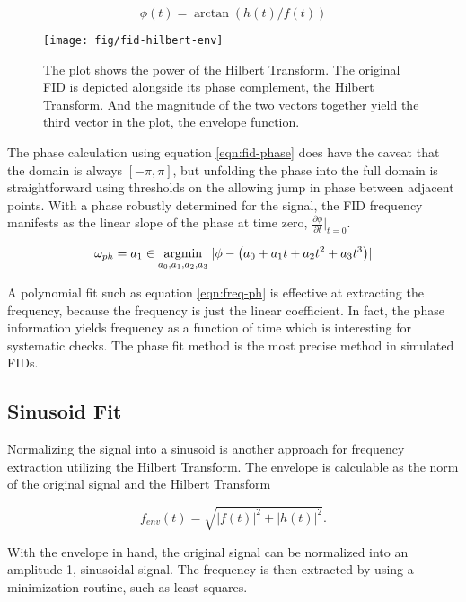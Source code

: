 \begin{equation}
\label{eqn:fid-phase}
\phi(t) = \arctan(h(t) / f(t))
\end{equation}

\begin{figure}
\texttt{[image: fig/fid-hilbert-env]}
\caption{
    The plot shows the power of the Hilbert Transform.  The original FID is depicted alongside its phase complement, the Hilbert Transform.  And the magnitude of the two vectors together yield the third vector in the plot, the envelope function.
    \label{fig:fid-hilbert-env}
}
\end{figure}

\noindent
The phase calculation using equation \ref{eqn:fid-phase} does have the caveat that the domain is always $[-\pi, \pi]$, but unfolding the phase into the full domain is straightforward using thresholds on the allowing jump in phase between adjacent points.  With a phase robustly determined for the signal, the FID frequency manifests as the linear slope of the phase at time zero, $\frac{\partial \phi}{\partial t}|_{t=0}$.

\begin{equation}
\label{eqn:freq-ph}
\omega_{ph} = a_1 \in \operatorname*{argmin}_{a_0, a_1, a_2, a_3} \;
\lvert \phi - \left(a_0 + a_1 t + a_2 t^2 + a_3 t^3\right) \rvert
\end{equation}

A polynomial fit such as equation \ref{eqn:freq-ph} is effective at extracting the frequency, because the frequency is just the linear coefficient.  In fact, the phase information yields frequency as a function of time which is interesting for systematic checks.  The phase fit method is the most precise method in simulated FIDs.

\subsection{Sinusoid Fit}
Normalizing the signal into a sinusoid is another approach for frequency extraction utilizing the Hilbert Transform.  The envelope is calculable as the norm of the original signal and the Hilbert Transform

\begin{equation}
\label{eqn:fid-envelope}
f_{env}(t) = \sqrt{|f(t)|^2 + |h(t)|^2}.
\end{equation}

\noindent 
With the envelope in hand, the original signal can be normalized into an amplitude 1, sinusoidal signal.  The frequency is then extracted by using a minimization routine, such as least squares.

